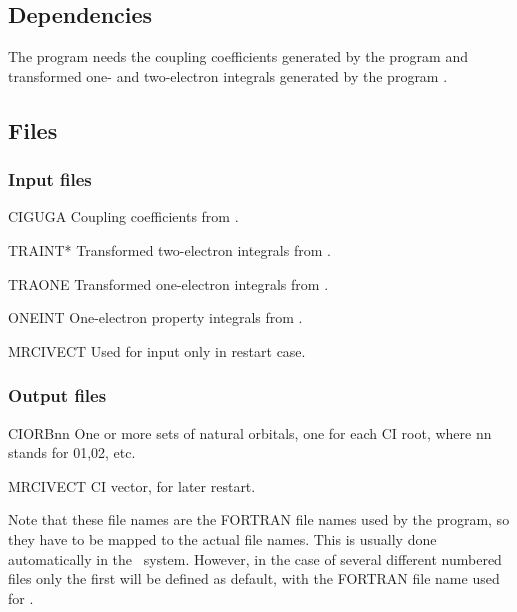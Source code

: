 \subsection{Dependencies}
\label{UG:sec:mrci_dependencies}
The program needs the coupling
coefficients generated by the program
 and transformed one- and two-electron integrals
generated by the program
.

\subsection{Files}
\label{UG:sec:mrci_files}
\subsubsection{Input files}

\begin{filelist}
\item[CIGUGA]
{Coupling coefficients from .}
\item[TRAINT*]
{Transformed two-{}electron integrals from .}
\item[TRAONE]
{Transformed one-{}electron integrals from .}
\item[ONEINT]
{One-{}electron property integrals from .}
\item[MRCIVECT]
{Used for input only in restart case.}
\end{filelist}

\subsubsection{Output files}
\begin{filelist}
\item[CIORBnn]
One or more sets of natural orbitals, one for each CI root, where
nn stands for 01,02, etc.
\item[MRCIVECT]
CI vector, for later restart.
\end{filelist}

Note that these file names are the FORTRAN file names used by the program,
so they have to be mapped to the actual file names. This is usually done
automatically in the \molcas\ system. However, in the case of several
different numbered files
 only the first will be defined as default,
with the FORTRAN file name
used for
.

